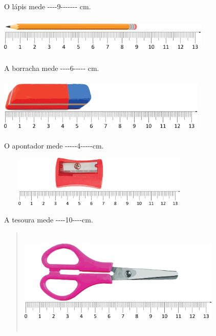 \begin{escolha}

\item
  O lápis mede -\/-\/-\/-9-\/-\/-\/-\/-\/-\/- cm.

  \includegraphics[width=4.00868in,height=0.70839in]{media/image42.png}



\item
  A borracha mede -\/-\/-\/-6-\/-\/-\/-\/- cm.

  \includegraphics[width=3.93367in,height=1.02509in]{media/image43.png}


\item
  O apontador mede -\/-\/-\/-\/-4-\/-\/-\/-\/-cm.

  \includegraphics[width=3.87534in,height=0.95842in]{media/image44.png}


\item
  A tesoura mede -\/-\/-\/-10-\/-\/-\/-cm.

  \begin{quote}
  \includegraphics[width=3.81700in,height=1.97517in]{media/image45.png}
\end{quote}


\end{escolha}

